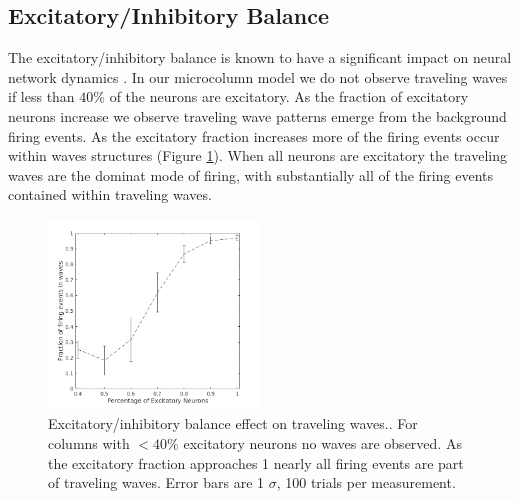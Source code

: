 \documentclass[a4paper,11pt]{article}
\begin{document}
\subsection{Excitatory/Inhibitory Balance}
The excitatory/inhibitory balance is known to have a significant impact on neural network dynamics \cite{keane2015}. 
In our microcolumn model we do not observe traveling waves if less than $40\%$ of the neurons are excitatory.
As the fraction of excitatory neurons increase we observe traveling wave patterns emerge from the background firing events.
As the excitatory fraction increases more of the firing events occur within waves structures (Figure \ref{fig:excitatory_effect}).
When all neurons are excitatory the traveling waves are the dominat mode of firing, with substantially all of the firing events contained within traveling waves. \\
\begin{figure}[!htb]
 \caption{Excitatory/inhibitory balance effect on traveling waves.. 
	  For columns with $<40\%$ excitatory neurons no waves are observed.
	  As the excitatory fraction approaches 1 nearly all firing events are part of traveling waves.
	  Error bars are 1 $\sigma$, 100 trials per measurement.
	  }
 \label{fig:excitatory_effect}
 \centering
   \includegraphics[width=0.5\textwidth]{fig/ExcitatoryWaves}
\end{figure}
\end{document}
